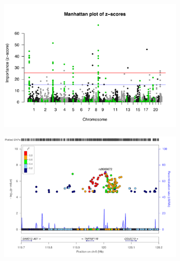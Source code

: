 \documentclass[10pt,letterpaper]{article}
\begin{document}
\begin{figure}[tbhp]
  \begin{adjustwidth}{-2.00in}{0in}
    \caption{\textbf{Genome-wide importance of SNPs and visualisation of the 22q.11 region}}
    \label{figure:ranksumtest}
     \begin{subfigure}[b]{0.5\linewidth}
     \includegraphics[totalheight=7cm]{./figs/BMDTopWholeGenome.png}
      \label{figure:rbo-prod.png} 
    \end{subfigure} 
 \begin{subfigure}[b]{0.5\linewidth}
      \centering
      \includegraphics[totalheight=7cm]{./figs/new_10k_TNFRSF11B.pdf}
      \label{zoomplotTNFRSF} 
   \end{subfigure} 
    \begin{subfigure}[b]{0.5\linewidth}

\end{subfigure}
\end{adjustwidth}
\end{figure}
\end{document}
